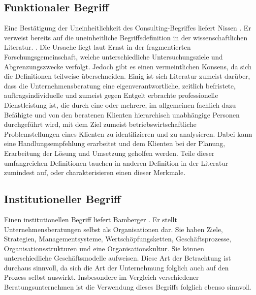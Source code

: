 \subsection*{Funktionaler Begriff}

Eine Bestätigung der Uneinheitlichkeit des Consulting-Begriffes liefert Nissen \cite[10]{nissen2007consulting}. Er verweist bereits auf die uneinheitliche Begriffsdefinition in der wissenschaftlichen Literatur. \cite[7]{ernst2002evaluation}. Die Ursache liegt laut Ernst \cite[10]{ernst2002evaluation} in der fragmentierten Forschungsgemeinschaft, welche unterschiedliche Untersuchungsziele und Abgrenzungszwecke verfolgt. 
Jedoch gibt es einen vermeintlichen Konsens, da sich die Definitionen teilweise überschneiden. Einig ist sich Literatur zumeist darüber, dass die Unternehmensberatung eine eigenverantwortliche, zeitlich befristete, auftragsindividuelle und zumeist gegen Entgelt erbrachte professionelle Dienstleistung \cite[14]{Lippold201309} ist, die durch eine oder mehrere, im allgemeinen fachlich dazu Befähigte und von den beratenen Klienten hierarchisch unabhängige Personen durchgeführt wird, mit dem Ziel zumeist betriebswirtschaftliche Problemstellungen eines Klienten zu identifizieren und zu analysieren. Dabei kann eine Handlungsempfehlung erarbeitet und dem Klienten bei der Planung, Erarbeitung der Lösung und Umsetzung geholfen werden.  \cite[15]{nissen2007consulting}
Teile dieser umfangreichen Definitionen tauchen in anderen Definition in der Literatur zumindest auf, oder charakterisieren einen dieser Merkmale. 
\subsection*{Institutioneller Begriff}

Einen institutionellen Begriff liefert Bamberger \cite[16]{bamberg2008strategische}.
Er stellt Unternehmensberatungen selbst als Organisationen dar. Sie haben Ziele, Strategien, Managementsysteme, Wertschöpfungsketten, Geschäftsprozesse, Organisationsstrukturen und eine Organisationskultur. Sie können unterschiedliche Geschäftsmodelle aufweisen. Diese Art der Betrachtung ist durchaus sinnvoll, da sich die Art der Unternehmung folglich auch auf den Prozess selbst auswirkt. Insbesondere im Vergleich verschiedener Beratungsunternehmen ist die Verwendung dieses Begriffs folglich ebenso sinnvoll.

